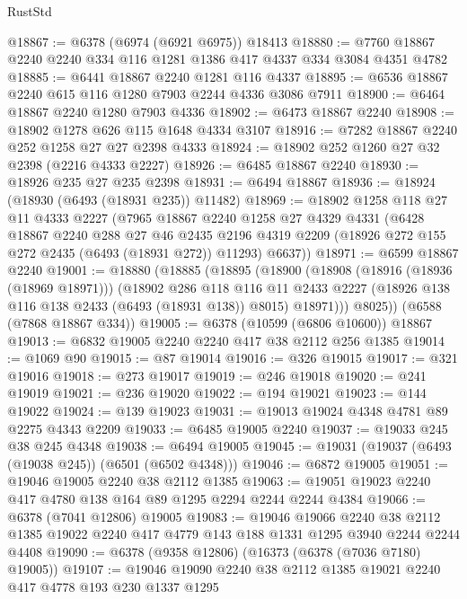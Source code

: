 \begin{lexlean}{RustStd}
\begin{coremodule}
@18867 := @6378 (@6974 (@6921 @6975)) @18413
@18880 := @7760 @18867 @2240 @2240 @334 @116 @1281 @1386 @417 @4337 @334 @3084 @4351 @4782
@18885 := @6441 @18867 @2240 @1281 @116 @4337
@18895 := @6536 @18867 @2240 @615 @116 @1280 @7903 @2244 @4336 @3086 @7911
@18900 := @6464 @18867 @2240 @1280 @7903 @4336
@18902 := @6473 @18867 @2240
@18908 := @18902 @1278 @626 @115 @1648 @4334 @3107
@18916 := @7282 @18867 @2240 @252 @1258 @27 @27 @2398 @4333
@18924 := @18902 @252 @1260 @27 @32 @2398 (@2216 @4333 @2227)
@18926 := @6485 @18867 @2240
@18930 := @18926 @235 @27 @235 @2398
@18931 := @6494 @18867
@18936 := @18924 (@18930 (@6493 (@18931 @235)) @11482)
@18969 := @18902
    @1258
    @118
    @27
    @11
    @4333
    @2227
    (@7965
      @18867
      @2240
      @1258
      @27
      @4329
      @4331
      (@6428
        @18867
        @2240
        @288
        @27
        @46
        @2435
        @2196
        @4319
        @2209
        (@18926 @272 @155 @272 @2435 (@6493 (@18931 @272)) @11293)
        @6637))
@18971 := @6599 @18867 @2240
@19001 := @18880
    (@18885
      (@18895
        (@18900
          (@18908
            (@18916 (@18936 (@18969 @18971)))
            (@18902
              @286
              @118
              @116
              @11
              @2433
              @2227
              (@18926 @138 @116 @138 @2433 (@6493 (@18931 @138)) @8015)
              @18971)))
        @8025))
    (@6588 (@7868 @18867 @334))
@19005 := @6378 (@10599 (@6806 @10600)) @18867
@19013 := @6832 @19005 @2240 @2240 @417 @38 @2112 @256 @1385
@19014 := @1069 @90
@19015 := @87 @19014
@19016 := @326 @19015
@19017 := @321 @19016
@19018 := @273 @19017
@19019 := @246 @19018
@19020 := @241 @19019
@19021 := @236 @19020
@19022 := @194 @19021
@19023 := @144 @19022
@19024 := @139 @19023
@19031 := @19013 @19024 @4348 @4781 @89 @2275 @4343 @2209
@19033 := @6485 @19005 @2240
@19037 := @19033 @245 @38 @245 @4348
@19038 := @6494 @19005
@19045 := @19031 (@19037 (@6493 (@19038 @245)) (@6501 (@6502 @4348)))
@19046 := @6872 @19005
@19051 := @19046 @19005 @2240 @38 @2112 @1385
@19063 := @19051 @19023 @2240 @417 @4780 @138 @164 @89 @1295 @2294 @2244 @2244 @4384
@19066 := @6378 (@7041 @12806) @19005
@19083 := @19046
    @19066
    @2240
    @38
    @2112
    @1385
    @19022
    @2240
    @417
    @4779
    @143
    @188
    @1331
    @1295
    @3940
    @2244
    @2244
    @4408
@19090 := @6378 (@9358 @12806) (@16373 (@6378 (@7036 @7180) @19005))
@19107 := @19046
    @19090
    @2240
    @38
    @2112
    @1385
    @19021
    @2240
    @417
    @4778
    @193
    @230
    @1337
    @1295

\end{coremodule}
\end{lexlean}
